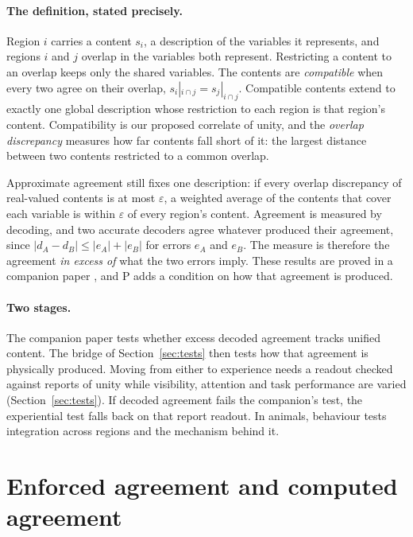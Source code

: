 \documentclass[12pt]{article}
\begin{document}
\paragraph{The definition, stated precisely.} Region $i$ carries a content
$s_i$, a description of the variables it represents, and regions $i$ and $j$
overlap in the variables both represent. Restricting a content to an overlap
keeps only the shared variables. The contents are \emph{compatible} when every
two agree on their overlap, $s_i|_{i\cap j}=s_j|_{i\cap j}$. Compatible contents
extend to exactly one global description whose restriction to each region is
that region's content. Compatibility is our proposed correlate of unity, and
the \emph{overlap discrepancy} measures how far contents fall short of it: the
largest distance between two contents restricted to a common overlap.

Approximate agreement still fixes one description: if every overlap discrepancy
of real-valued contents is at most $\varepsilon$, a weighted average of the
contents that cover each variable is within $\varepsilon$ of every region's
content. Agreement is measured by decoding, and two accurate decoders agree
whatever produced their agreement, since $|d_A-d_B|\le|e_A|+|e_B|$ for errors
$e_A$ and $e_B$. The measure is therefore the agreement \emph{in excess of} what
the two errors imply. These results are proved in a companion paper
\citep{bobadillasuarez2026coherence}, and P adds a condition on how that
agreement is produced.

\paragraph{Two stages.} The companion paper tests whether excess decoded
agreement tracks unified content. The bridge of Section~\ref{sec:tests} then
tests how that agreement is physically produced. Moving from either to
experience needs a readout checked against reports of unity while visibility,
attention and task performance are varied (Section~\ref{sec:tests}). If decoded
agreement fails the companion's test, the experiential test falls back on that
report readout. In animals, behaviour tests integration across regions and the
mechanism behind it.

\section{Enforced agreement and computed agreement}
\label{sec:enforcement}
\end{document}
